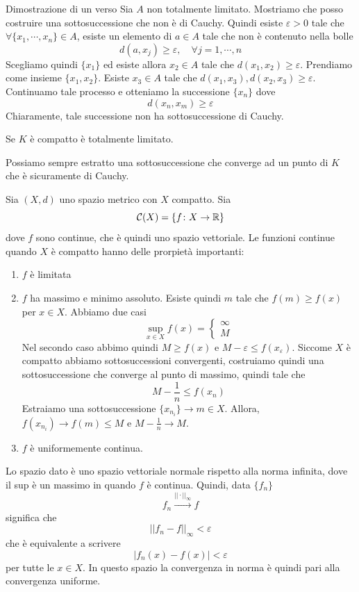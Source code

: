 \documentclass[a4paper]{article}
\begin{document}
\begin{snippetproof}{Dimostrazione di un verso}
    Sia \(A\) non totalmente limitato.
    Mostriamo che posso costruire una sottosuccessione che non è di Cauchy.
    Quindi esiste \(\varepsilon>0\) tale che \(\forall \{x_1, \cdots, x_n\} \in A\),
    esiste un elemento di \(a\in A\) tale che non è contenuto nella bolle
    \[
        d(a, x_j) \geq \varepsilon, \quad \forall j=1, \cdots, n
    \]
    Scegliamo quindi \(\{x_1\}\) ed esiste allora \(x_2\in A\) tale
    che \(d(x_1, x_2) \geq \varepsilon\).
    Prendiamo come insieme \(\{x_1, x_2\}\). Esiste \(x_3 \in A\)
    tale che \(d(x_1, x_3), d(x_2, x_3) \geq \varepsilon\).
    Continuamo tale processo e otteniamo la successione \(\{x_n\}\) dove
    \[
        d(x_n, x_m) \geq \varepsilon
    \]
    Chiaramente, tale successione non ha sottosuccessione di Cauchy.
\end{snippetproof}

\begin{snippetproposition}{}
    Se \(K\) è compatto è totalmente limitato.
\end{snippetproposition}

Possiamo sempre estratto una sottosuccessione che converge ad un punto di \(K\)
che è sicuramente di Cauchy.

Sia \((X, d)\) uno spazio metrico con \(X\) compatto.
Sia
\[
    \mathcal{C}(X) = \{f\colon X \to \mathbb{R}\}
\]
dove \(f\) sono continue, che è quindi uno spazio vettoriale.
Le funzioni continue quando \(X\) è compatto hanno delle prorpietà importanti:
\begin{enumerate}
    \item \(f\) è limitata
    \item \(f\) ha massimo e minimo assoluto.
    Esiste quindi \(m\) tale che \(f(m) \geq f(x)\) per \(x\in X\).
    Abbiamo due casi
    \[
        \sup_{x\in X} f(x) = \begin{cases}
            \infty \\
            M
        \end{cases}
    \]
    Nel secondo caso abbimo quindi \(M \geq f(x)\) e \(M - \varepsilon \leq f(x_{\varepsilon})\).
    Siccome \(X\) è compatto abbiamo sottosuccessioni convergenti, costruiamo quindi
    una sottosuccessione che converge al punto di massimo, quindi tale che
    \[
        M - \frac{1}{n} \leq f(x_n)
    \]
    Estraiamo una sottosuccessione \(\{x_{n_i}\} \to m \in X\).
    Allora, \(f(x_{n_i}) \to f(m) \leq M\) e \(M - \frac{1}{n} \to M\).

    \item \(f\) è uniformemente continua.
\end{enumerate}
Lo spazio dato è uno spazio vettoriale normale rispetto alla norma infinita,
dove il sup è un massimo in quando \(f\) è continua.
Quindi, data \(\{f_n\}\)
\[
    f_n \overset{||\cdot||_\infty}{\longrightarrow} f
\]
significa che
\[
    ||f_n - f||_\infty < \varepsilon
\]
che è equivalente a scrivere
\[
    |f_n(x) - f(x)| < \varepsilon
\]
per tutte le \(x\in X\).
In questo spazio la convergenza in norma è quindi pari alla convergenza uniforme.
\end{document}
